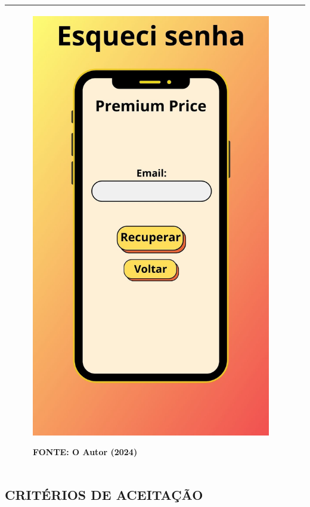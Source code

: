 \begin{tabular}{|ll|}
\begin{minipage}{0.48\textwidth}
\begin{figure}[H]
\includegraphics[width=\textwidth]{fig/telas/t_esqueci.jpg}
\footnotesize \centering
\par FONTE: O Autor (2024)
\end{figure}
\end{minipage}
 \\ \hline
\end{tabular}

\subsection*{\textbf{CRITÉRIOS DE ACEITAÇÃO}}

